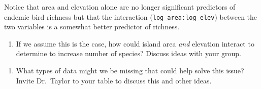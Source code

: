 \documentclass[11pt]{article}
\newcommand{\bigSpace}{\vspace{4\baselineskip}}
\begin{document}
Notice that area and elevation alone are no longer significant predictors of endemic bird richness but that the interaction (\texttt{log\_area:log\_elev}) between the two variables is a somewhat better predictor of richness.


\begin{enumerate}[resume]
\item If we assume this is the case, how could island area \emph{and} elevation interact to determine to increase number of species? Discuss ideas with your group.

\bigSpace 

\end{enumerate}


\begin{enumerate}[resume]
\item What types of data might we be missing that could help solve this issue? Invite Dr.~Taylor to your table to discuss this and other ideas.
\end{enumerate}

\newpage



\newpage

\thispagestyle{empty}
\end{document}
